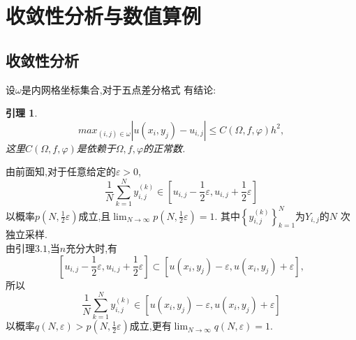 \documentclass[UTF8,a4paper,notitlepage]{ctexart}%
\newtheorem{lemma}{引理}[section]
\theoremstyle{nonumberplain}
\begin{document}
\section{收敛性分析与数值算例}
\subsection{收敛性分析}
设$\omega $是内网格坐标集合,对于五点差分格式
有结论:
\begin{lemma}
    \begin{equation*}
        max_{(i,j)\in \omega}\left\lvert u(x_i,y_j)-u_{i,j}\right\rvert 
    \leq C(\Omega,f,\varphi )h^2,
    \end{equation*}
这里$C(\Omega,f,\varphi )$是依赖于$\Omega,f,\varphi$的正常数.
\end{lemma}
由前面知,对于任意给定的$\varepsilon>0$, 
\begin{equation*}
    \frac{1}{N}\sum_{k = 1}^{N}y_{i,j}^{(k)} \in\left[ u_{i,j}-\frac{1}{2}\varepsilon ,u_{i,j}+\frac{1}{2}\varepsilon \right] 
\end{equation*}
以概率$p(N,\frac{1}{2}\varepsilon)$成立,且$\lim_{N \to \infty}p(N,\frac{1}{2}\varepsilon)=1$.
其中$\left\{y_{i,j}^{(k)}\right\}_{k=1}^{N} $为$Y_{i,j}$的$N$
次独立采样.\\
由引理$3.1$,当$n$充分大时,有
\begin{equation*}
    \left[ u_{i,j}-\frac{1}{2}\varepsilon ,u_{i,j}+\frac{1}{2}\varepsilon \right] \subset
    \left[ u(x_i,y_j)-\varepsilon ,u(x_i,y_j)+\varepsilon \right] ,
\end{equation*}
所以 
\begin{equation*}
    \frac{1}{N}\sum_{k = 1}^{N}y_{i,j}^{(k)} \in \left[ u(x_i,y_j)-\varepsilon ,u(x_i,y_j)+\varepsilon \right] 
\end{equation*}
以概率$q(N,\varepsilon)>p(N,\frac{1}{2}\varepsilon)$成立,更有$\lim_{N \to \infty}q(N,\varepsilon)=1$.
\end{document}
